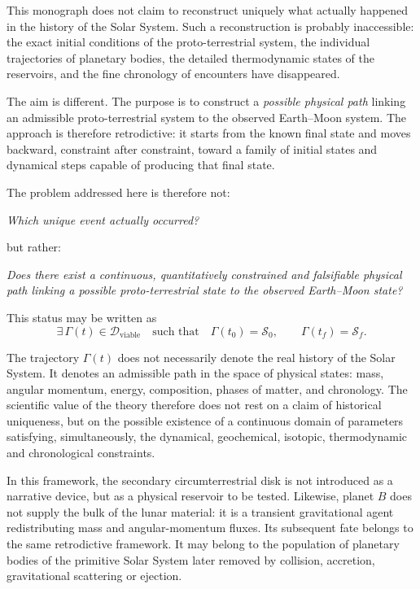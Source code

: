 \documentclass[11pt,a4paper,openany]{report}
\begin{document}
This monograph does not claim to reconstruct uniquely what actually happened
in the history of the Solar System. Such a reconstruction is probably
inaccessible: the exact initial conditions of the proto-terrestrial system, the
individual trajectories of planetary bodies, the detailed thermodynamic states
of the reservoirs, and the fine chronology of encounters have disappeared.

The aim is different. The purpose is to construct a \emph{possible physical
path} linking an admissible proto-terrestrial system to the observed
Earth--Moon system. The approach is therefore retrodictive: it starts from the
known final state and moves backward, constraint after constraint, toward a
family of initial states and dynamical steps capable of producing that final
state.

The problem addressed here is therefore not:

\begin{center}
\emph{Which unique event actually occurred?}
\end{center}

but rather:

\begin{center}
\emph{Does there exist a continuous, quantitatively constrained and falsifiable
physical path linking a possible proto-terrestrial state to the observed
Earth--Moon state?}
\end{center}

This status may be written as
\begin{equation}
\boxed{
\exists\,\Gamma(t)\in\mathcal{D}_{\mathrm{viable}}
\quad\text{such that}\quad
\Gamma(t_0)=\mathcal{S}_0,\qquad
\Gamma(t_f)=\mathcal{S}_f .
}
\label{eq:retrodictive-status}
\end{equation}

The trajectory $\Gamma(t)$ does not necessarily denote the real history of the
Solar System. It denotes an admissible path in the space of physical states:
mass, angular momentum, energy, composition, phases of matter, and chronology.
The scientific value of the theory therefore does not rest on a claim of
historical uniqueness, but on the possible existence of a continuous domain of
parameters satisfying, simultaneously, the dynamical, geochemical, isotopic,
thermodynamic and chronological constraints.

In this framework, the secondary circumterrestrial disk is not introduced as a
narrative device, but as a physical reservoir to be tested. Likewise, planet
$B$ does not supply the bulk of the lunar material: it is a
transient gravitational agent redistributing mass and angular-momentum fluxes.
Its subsequent fate belongs to the same retrodictive framework. It may belong
to the population of planetary bodies of the primitive Solar System later
removed by collision, accretion, gravitational scattering or ejection.
\end{document}

